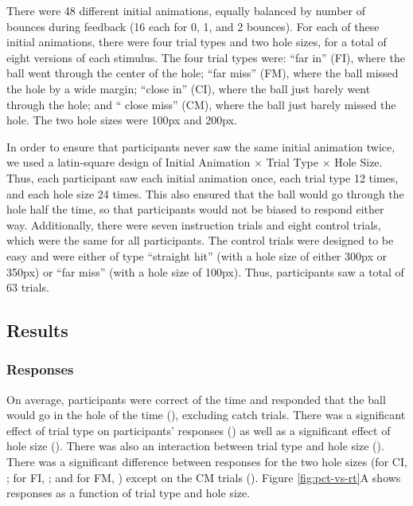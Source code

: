 \documentclass[10pt,letterpaper]{article}
\begin{document}
There were 48 different initial animations, equally balanced by number of bounces during feedback (16 each for 0, 1, and 2 bounces). 
For each of these initial animations, there were four trial types and two hole sizes, for a total of eight versions of each stimulus. 
The four trial types were: ``far in'' (FI), where the ball went through the center of the hole; ``far miss'' (FM), where the ball missed the hole by a wide margin; ``close in'' (CI), where the ball just barely went through the hole; and `` close miss'' (CM), where the ball just barely missed the hole. 
The two hole sizes were 100px and 200px.

In order to ensure that participants never saw the same initial animation twice, we used a latin-square design of Initial Animation $\times$ Trial Type $\times$ Hole Size.
Thus, each participant saw each initial animation once, each trial type 12 times, and each hole size 24 times.
This also ensured that the ball would go through the hole half the time, so that participants would not be biased to respond either way.
Additionally, there were seven instruction trials and eight control trials, which were the same for all participants.
The control trials were designed to be easy and were either of type ``straight hit'' (with a hole size of either 300px or 350px) or ``far miss'' (with a hole size of 100px).
Thus, participants saw a total of 63 trials.

\subsection{Results}

\subsubsection{Responses}

On average, participants were correct \AvgCorrect{} of the time and responded that the ball would go in the hole \AvgResponse{} of the time (\ResponseN{}), excluding catch trials.
There was a significant effect of trial type on participants' responses (\ResponseHoleClass{}) as well as a significant effect of hole size (\ResponseHoleSize{}).
There was also an interaction between trial type and hole size (\ResponseFull{}).
There was a significant difference between responses for the two hole sizes (for CI, \ResponseCIttest{}; for FI, \ResponseCIttest{}; and for FM, \ResponseFMttest{}) except on the CM trials (\ResponseCMttest{}).
Figure \ref{fig:pct-vs-rt}A shows responses as a function of trial type and hole size.
\end{document}

